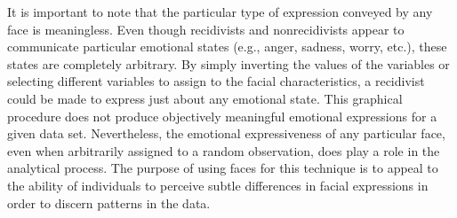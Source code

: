 It is important to note that the particular type of expression conveyed by any face is meaningless.  Even though recidivists and nonrecidivists appear to communicate particular emotional states (e.g., anger, sadness, worry, etc.), these states are completely arbitrary.  By simply inverting the values of the variables or selecting different variables to assign to the facial characteristics, a recidivist could be made to express just about any emotional state.  This graphical procedure does not produce objectively meaningful emotional expressions for a given data set.  Nevertheless, the emotional expressiveness of any particular face, even when arbitrarily assigned to a random observation, does play a role in the analytical process.  The purpose of using faces for this technique is to appeal to the ability of individuals to perceive subtle differences in facial expressions in order to discern patterns in the data.    